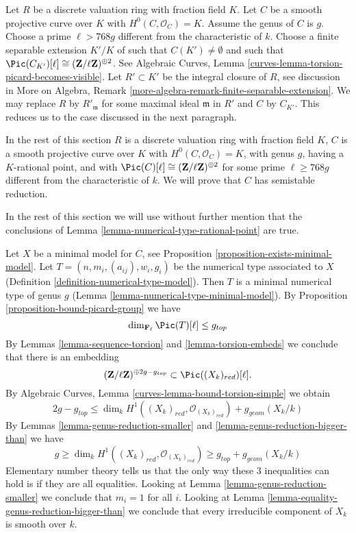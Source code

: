 \medskip\noindent
Let $R$ be a discrete valuation ring with fraction field $K$.
Let $C$ be a smooth projective curve over $K$ with $H^0(C, \mathcal{O}_C) = K$.
Assume the genus of $C$ is $g$.
Choose a prime $\ell > 768g$ different from the characteristic of $k$.
Choose a finite separable extension $K'/K$ of
such that $C(K') \not = \emptyset$ and such that
$\Pic(C_{K'})[\ell] \cong (\mathbf{Z}/\ell \mathbf{Z})^{\oplus 2}$.
See
Algebraic Curves, Lemma \ref{curves-lemma-torsion-picard-becomes-visible}.
Let $R' \subset K'$ be the integral closure of $R$, see
discussion in More on Algebra, Remark
\ref{more-algebra-remark-finite-separable-extension}.
We may replace $R$ by $R'_{\mathfrak m}$ for some maximal ideal
$\mathfrak m$ in $R'$ and $C$ by $C_{K'}$. This
reduces us to the case discussed in the next paragraph.

\medskip\noindent
In the rest of this section
$R$ is a discrete valuation ring with fraction field $K$,
$C$ is a smooth projective curve over $K$ with $H^0(C, \mathcal{O}_C) = K$,
with genus $g$, having a $K$-rational point, and with
$\Pic(C)[\ell] \cong (\mathbf{Z}/\ell \mathbf{Z})^{\oplus 2}$
for some prime $\ell \geq 768g$ different from the characteristic of $k$.
We will prove that $C$ has semistable reduction.

\medskip\noindent
In the rest of this section we will use without further mention
that the conclusions of Lemma \ref{lemma-numerical-type-rational-point}
are true.

\medskip\noindent
Let $X$ be a minimal model for $C$, see
Proposition \ref{proposition-exists-minimal-model}.
Let $T = (n, m_i, (a_{ij}), w_i, g_i)$
be the numerical type associated to $X$
(Definition \ref{definition-numerical-type-model}).
Then $T$ is a minimal numerical type of genus $g$
(Lemma \ref{lemma-numerical-type-minimal-model}).
By Proposition \ref{proposition-bound-picard-group}
we have
$$
\dim_{\mathbf{F}_\ell} \Pic(T)[\ell] \leq g_{top}
$$
By Lemmas \ref{lemma-sequence-torsion} and \ref{lemma-torsion-embeds}
we conclude that there is an embedding
$$
(\mathbf{Z}/\ell \mathbf{Z})^{\oplus 2g - g_{top}}
\subset \Pic((X_k)_{red})[\ell].
$$
By Algebraic Curves, Lemma \ref{curves-lemma-bound-torsion-simple} we obtain
$$
2g - g_{top} \leq
\dim_k H^1((X_k)_{red}, \mathcal{O}_{(X_k)_{red}}) + g_{geom}(X_k/k)
$$
By Lemmas \ref{lemma-genus-reduction-smaller} and
\ref{lemma-genus-reduction-bigger-than}
we have
$$
g \geq \dim_k H^1((X_k)_{red}, \mathcal{O}_{(X_k)_{red}}) \geq
g_{top} + g_{geom}(X_k/k)
$$
Elementary number theory tells us that the only way these $3$
inequalities can hold is if they are all equalities.
Looking at Lemma \ref{lemma-genus-reduction-smaller}
we conclude that $m_i = 1$ for all $i$.
Looking at Lemma \ref{lemma-equality-genus-reduction-bigger-than}
we conclude that every irreducible component of $X_k$
is smooth over $k$.

